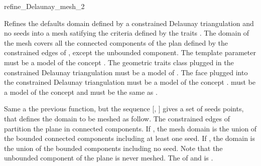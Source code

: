 \begin{ccRefFunction}{refine_Delaunay_mesh_2}


{ Refines the defaults domain defined by a constrained Delaunay
  triangulation and no seeds into a mesh satifying the criteria
  defined by the traits . The domain of the mesh
  covers all the connected components of the plan defined by the
  constrained edges of , except the unbounded component.
  \ccPrecond The template parameter  must be a model of the
  concept . The geometric traits
  class plugged in the constrained Delaunay triangulation must be a model
  of . The face plugged into the constrained
  Delaunay triangulation must be a model of the concept
  .  must be a model of the
  concept  and  must be the same
  as . }

                     { Same a the previous function, but the sequence
                       [, ] gives a set of
                       seeds points, that defines the domain to be
                       meshed as follow. The constrained edges of
                        partition the plane in connected
                       components. If , the mesh domain
                       is the union of the bounded connected
                       components including at least one seed. If
                       , the domain is the union of
                       the bounded components including no seed. Note
                       that the unbounded component of the plane is
                       never meshed.
                       \ccPrecond The  of 
                       and  is
                       .}

\end{ccRefFunction}

